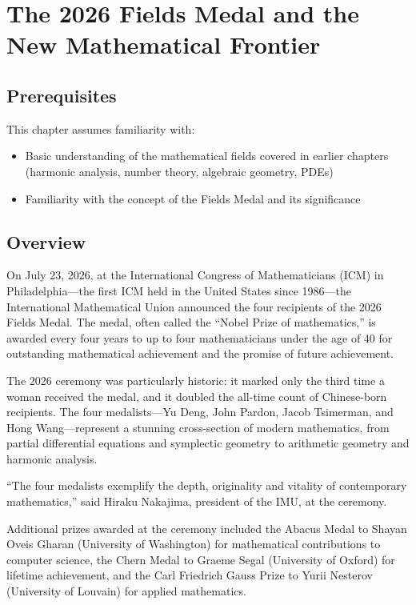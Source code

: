 \let\LocalMacro\relax

\chapter{The 2026 Fields Medal and the New Mathematical Frontier}

\section{Prerequisites}
This chapter assumes familiarity with:
\begin{itemize}
\item Basic understanding of the mathematical fields covered in earlier chapters (harmonic analysis, number theory, algebraic geometry, PDEs)
\item Familiarity with the concept of the Fields Medal and its significance
\end{itemize}

\section{Overview}
On July 23, 2026, at the International Congress of Mathematicians (ICM) in Philadelphia---the first ICM held in the United States since 1986---the International Mathematical Union announced the four recipients of the 2026 Fields Medal. The medal, often called the ``Nobel Prize of mathematics,'' is awarded every four years to up to four mathematicians under the age of 40 for outstanding mathematical achievement and the promise of future achievement.

The 2026 ceremony was particularly historic: it marked only the third time a woman received the medal, and it doubled the all-time count of Chinese-born recipients. The four medalists---Yu Deng, John Pardon, Jacob Tsimerman, and Hong Wang---represent a stunning cross-section of modern mathematics, from partial differential equations and symplectic geometry to arithmetic geometry and harmonic analysis.

\begin{historicalbox}
``The four medalists exemplify the depth, originality and vitality of contemporary mathematics,'' said Hiraku Nakajima, president of the IMU, at the ceremony.
\end{historicalbox}

Additional prizes awarded at the ceremony included the Abacus Medal to Shayan Oveis Gharan (University of Washington) for mathematical contributions to computer science, the Chern Medal to Graeme Segal (University of Oxford) for lifetime achievement, and the Carl Friedrich Gauss Prize to Yurii Nesterov (University of Louvain) for applied mathematics.

